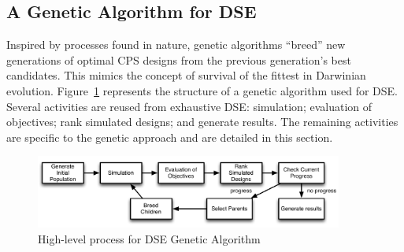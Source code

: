 \subsection{A Genetic Algorithm for DSE}
Inspired by processes found in nature, genetic algorithms ``breed'' new generations of optimal CPS designs from the previous generation's best candidates. This mimics the concept of survival of the fittest in Darwinian evolution.
Figure~\ref{fig:ga_dse_process} represents the structure of a genetic algorithm used for DSE.  Several activities are reused from exhaustive DSE: simulation; evaluation of objectives; rank simulated designs; and generate results. The remaining activities are specific to the genetic approach and are detailed in this section.

\begin{figure}[h!]
	\centering
	\includegraphics[width=0.9\textwidth]{figures/ga_process}
	\caption{High-level process for DSE Genetic Algorithm}
	\label{fig:ga_dse_process}
\end{figure}

